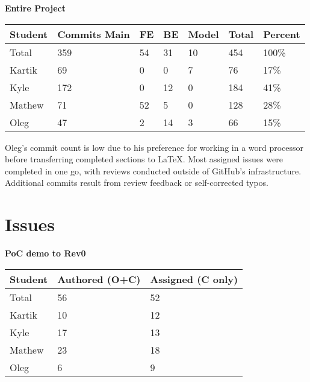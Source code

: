 \documentclass{article}
\begin{document}
\begin{table}[H]
    \centering
    \textbf{Entire Project}\\
    \begin{tabular}{lllllll}
    \toprule
    \textbf{Student} & \textbf{Commits Main} & \textbf{FE} & \textbf{BE} & \textbf{Model} & \textbf{Total}& \textbf{Percent}\\
    \midrule
    Total & 359 & 54 & 31 & 10 & 454 & 100\% \\
    Kartik & 69 & 0 & 0 & 7 & 76 & 17\%\\
    Kyle   & 172 & 0 & 12 & 0 & 184 & 41\%\\
    Mathew & 71 & 52 & 5 & 0 & 128 & 28\% \\
    Oleg   & 47 &  2 & 14 & 3 & 66 & 15\% \\
    \bottomrule
    \end{tabular}
\end{table}

Oleg's commit count is low due to his preference for working in a word processor before transferring completed sections to LaTeX. Most assigned issues were completed in one go, with reviews conducted outside of GitHub's infrastructure. Additional commits result from review feedback or self-corrected typos.



\section{Issues} 
\begin{table}[H]
\centering
\textbf{PoC demo to Rev0}\\
\begin{tabular}{lll}
\toprule
\textbf{Student} & \textbf{Authored (O+C)} & \textbf{Assigned (C only)}\\
\midrule
Total & 56 & 52 \\
Kartik & 10 & 12\\
Kyle   & 17 & 13\\
Mathew & 23 & 18\\
Oleg   & 6 & 9\\
\bottomrule
\end{tabular}
\end{table}
\end{document}

